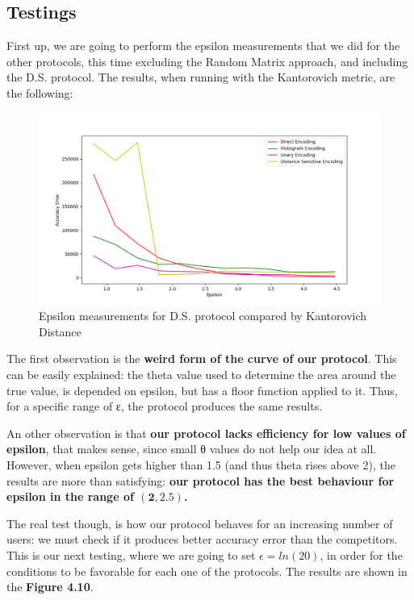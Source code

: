 \subsection{Testings}
First up, we are going to perform the epsilon measurements that we did for the other protocols, this time excluding the Random Matrix approach, and including the D.S. protocol. The results, when running with the Kantorovich metric, are the following:

\begin{figure}[!htb]\centering
    \includegraphics[width=1\textwidth]{images/epsilon_our_kant.png}
    \caption{Epsilon measurements for D.S. protocol compared by Kantorovich Distance}
\end{figure}

The first observation is the \textbf{weird form of the curve of our protocol}. This can be easily explained: the theta value used to determine the area around the true value, is depended on epsilon, but has a floor function applied to it. Thus, for a specific range of ε, the protocol produces the same results. 

An other observation is that\textbf{ our protocol lacks efficiency for low values of epsilon}, that makes sense, since small θ values do not help our idea at all. However, when epsilon gets higher than 1.5 (and thus theta rises above 2), the results are more than satisfying: \textbf{our protocol has the best behaviour for epsilon in the range of $\mathbf{(2, 2.5)}$.}

The real test though, is how our protocol behaves for an increasing number of users: we must check if it produces better accuracy error than the competitors. This is our next testing, where we are going to set $\epsilon = ln(20)$, in order for the conditions to be favorable for each one of the protocols. The results are shown in the \textbf{Figure 4.10}.


